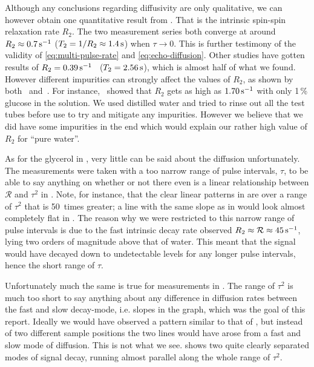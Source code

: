 \documentclass[11pt,a4paper, twocolumn,
swedish, english %
]{article}
\begin{document}
Although any conclusions regarding diffusivity are only
qualitative, we can however obtain one quantitative result from
. That is the intrinsic spin-spin relaxation
rate $R_2$. The two measurement series both converge at around
$R_2\approx\unit[0.7]{s^{-1}}$ ($T_2=1/R_2\approx\unit[1.4]{s}$) when
$\tau\to0$. This is further testimony 
of the validity of \eqref{eq:multi-pulse-rate} and
\eqref{eq:echo-diffusion}. Other studies have gotten results of
$R_2=\unit[0.39]{s^{-1}}$~\cite{Sabadini-etal2008}
($T_2=\unit[2.56]{s}$), which is almost half of what we
found. However different impurities can strongly affect the values of
$R_2$, as shown by both~\cite{Sabadini-etal2008}
and~\cite{Nelson-etal2002}. For instance,~\cite{Sabadini-etal2008}
showed that $R_2$ gets as high as $\unit[1.70]{s^{-1}}$ with only
1\,\% glucose in the solution. We used distilled water and tried to
rinse out all the test tubes before use to try and mitigate any
impurities. However we believe that we did have some impurities in
the end which would explain our rather high value of $R_2$ for ``pure
water''.  

As for the glycerol in , very little can be said
about the diffusion unfortunately. The measurements were taken with a
too narrow range of pulse intervals, $\tau$, to be able to say 
anything on whether or not there even is a linear relationship
between $\mathcal{R}$ and $\tau^2$ in . Note, for
instance, that the clear linear patterns in  are
over a range of $\tau^2$ that is 50~times greater; a line with the
same slope as in  would look almost completely
flat in . The reason why we were restricted to this
narrow range of pulse intervals is due to the fast intrinsic decay rate
observed $R_2\approx\mathcal{R}\approx\unit[45]{s^{-1}}$, lying two
orders of magnitude above that of water. This meant that the signal
would have decayed down to undetectable levels for any longer pulse
intervals, hence the short range of $\tau$.

Unfortunately much the same is true for measurements in
. The range of $\tau^2$ is much too short to say
anything about any difference in diffusion rates between the fast and
slow decay-mode, i.e. slopes in the graph, which was the goal of this
report. Ideally we would have observed a pattern similar to that of
, but instead of two different sample positions
the two lines would have arose from a fast and slow mode of
diffusion. This is not what we see.  shows two
quite clearly separated modes of signal decay, running almost parallel
along the whole range of $\tau^2$.
\end{document}
